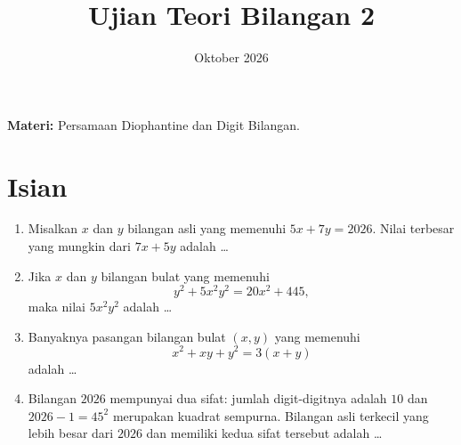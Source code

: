\documentclass[12pt]{scrartcl}
\title{Ujian Teori Bilangan 2}
\date{Oktober 2026}
\begin{document}
\maketitle

\renewcommand*\contentsname{Daftar Isi}
\tableofcontents

\newpage
\textbf{Materi:} Persamaan Diophantine dan Digit Bilangan.

\section{Isian}

\begin{enumerate}

	\item Misalkan $x$ dan $y$ bilangan asli yang memenuhi $5x + 7y = 2026$.
	Nilai terbesar yang mungkin dari $7x + 5y$ adalah \dots

	\item Jika $x$ dan $y$ bilangan bulat yang memenuhi
	\[ y^2 + 5x^2y^2 = 20x^2 + 445, \]
	maka nilai $5x^2y^2$ adalah \dots

	\item Banyaknya pasangan bilangan bulat $(x, y)$ yang memenuhi
	\[ x^2 + xy + y^2 = 3(x + y) \]
	adalah \dots

	\item Bilangan $2026$ mempunyai dua sifat: jumlah digit-digitnya adalah $10$
	dan $2026 - 1 = 45^2$ merupakan kuadrat sempurna.
	Bilangan asli terkecil yang lebih besar dari $2026$ dan memiliki kedua sifat tersebut adalah \dots


\end{enumerate}
\end{document}

